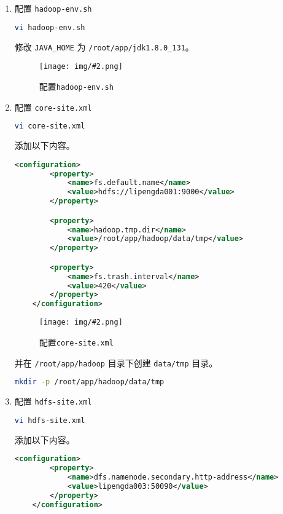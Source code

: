 \documentclass{article}
\newenvironment{enum}{
    \begin{enumerate}[label=(\arabic*), noitemsep]
}{
    \end{enumerate}
}
\newcommand{\img}[3][0.9]{%
    \begin{figure}[H]
        \centering
        \texttt{[image: img/\#2.png]}
        \caption{#3}
    \end{figure}
}
\begin{document}
\begin{enum}
    \item 配置 \texttt{hadoop-env.sh}
    
    \begin{lstlisting}[language=bash]
    vi hadoop-env.sh
    \end{lstlisting}
    
    修改 \texttt{JAVA\_HOME} 为 \texttt{/root/app/jdk1.8.0\_131}。

    \img{7.1.2.1}{配置\texttt{hadoop-env.sh}}

    \item 配置 \texttt{core-site.xml}
    
    \begin{lstlisting}[language=bash]
    vi core-site.xml
    \end{lstlisting}

    添加以下内容。

    \begin{lstlisting}[language=xml]
    <configuration>
        <property>
            <name>fs.default.name</name>
            <value>hdfs://lipengda001:9000</value>
        </property>

        <property>
            <name>hadoop.tmp.dir</name>
            <value>/root/app/hadoop/data/tmp</value>
        </property>

        <property>
            <name>fs.trash.interval</name>
            <value>420</value>
        </property>
    </configuration>
    \end{lstlisting}

    \img{7.1.2.2}{配置\texttt{core-site.xml}}

    并在 \texttt{/root/app/hadoop} 目录下创建 \texttt{data/tmp} 目录。

    \begin{lstlisting}[language=bash]
    mkdir -p /root/app/hadoop/data/tmp
    \end{lstlisting}

    \item 配置 \texttt{hdfs-site.xml}
    
    \begin{lstlisting}[language=bash]
    vi hdfs-site.xml
    \end{lstlisting}

    添加以下内容。

    \begin{lstlisting}[language=xml]
    <configuration>
        <property>
            <name>dfs.namenode.secondary.http-address</name>
            <value>lipengda003:50090</value>
        </property>
    </configuration>
    \end{lstlisting}


\end{enum}
\end{document}
